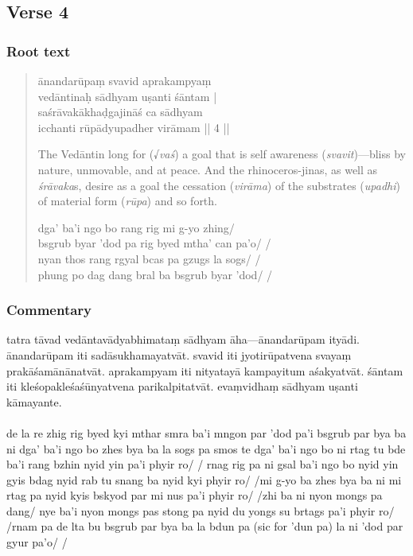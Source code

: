 \documentclass[12pt]{article}
\newcommand{\emdash} {\hspace{0em}—\hspace{0em}}
\begin{document}
\subsection{Verse 4}
\subsubsection{Root text}
\begin{quote}
	ānandarūpaṃ svavid aprakampyaṃ \\
	vedāntinaḥ sādhyam uṣanti śāntam\footnoteB{
		śāntam] \corr ; sāntam \MS\ \EDD
	} |\\
	saśrāvakākhaḍgajināś ca sādhyam\\
	icchanti rūpādyupadher virāmam || 4 ||

	The Vedāntin long for (√\emph{vaś}) a goal that is self awareness (\emph{svavit})\emdash bliss by nature, unmovable, and at peace. And the rhinoceros-jinas, as well as \emph{śrāvaka}s, desire as a goal the cessation (\emph{virāma}) of the substrates (\emph{upadhi}) of material form (\emph{rūpa}) and so forth.

	dga' ba'i ngo bo rang rig mi g-yo zhing/ \\
	bsgrub byar 'dod pa rig byed mtha' can pa'o/ /\\
	nyan thos rang rgyal bcas pa gzugs la sogs/ /\\
	phung po dag dang bral ba bsgrub byar 'dod/ /
\end{quote}

\subsubsection{Commentary}
tatra tāvad vedāntavādyabhimataṃ sādhyam āha\emdash ānandarūpam ityādi.
ānandarūpam iti sadāsukhamayatvāt.
svavid iti jyotirūpatvena\footnoteB{
	jyotīrūpatvena] \MS ; jyotirūpatvena \EDD
} svayaṃ prakāśamānānatvāt.\footnoteB{
	prakāśamānānatvāt] \EDD\ (\emd); prakāśamānāt \MS
}
aprakampyam iti nityatayā\footnoteB{
	nityatayā] \EDD ; anityatayā \MS
} kampayitum aśakyatvāt.
śāntam\footnoteB{
	śāntam] \corr ; sāntam \MS\ \EDD
} iti kleśopakleśaśūnyatvena parikalpitatvāt.
evaṃvidhaṃ sādhyam uṣanti kāmayante.\\

\textbf{\TVA}\\
de la re zhig rig byed kyi mthar smra ba'i mngon par 'dod pa'i bsgrub par bya ba ni dga' ba'i ngo bo zhes bya ba la sogs pa smos te dga' ba'i ngo bo ni rtag tu bde ba'i rang bzhin nyid yin pa'i phyir ro/ / rnag rig pa ni gsal ba'i ngo bo nyid yin gyis bdag nyid rab tu snang ba nyid kyi phyir ro/ /mi g-yo ba zhes bya ba ni mi rtag pa nyid kyis bskyod par mi nus pa'i phyir ro/ /zhi ba ni nyon mongs pa dang/ nye ba'i nyon mongs pas stong pa nyid du yongs su brtags pa'i phyir ro/ /rnam pa de lta bu bsgrub par bya ba la bdun pa (sic for 'dun pa) la ni 'dod par gyur pa'o/ /\\
\end{document}
